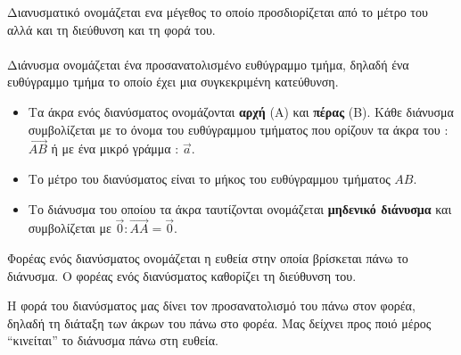 \documentclass[twoside,nofonts,internet,shmeiwseis]{thewria}
\begin{document}
\orismoi
{}
Διανυσματικό ονομάζεται ενα μέγεθος το οποίο προσδιορίζεται από το μέτρο του αλλά και τη διεύθυνση και τη φορά του.\\\\
Διάνυσμα ονομάζεται ένα προσανατολισμένο ευθύγραμμο τμήμα, δηλαδή ένα ευθύγραμμο τμήμα το οποίο έχει μια συγκεκριμένη κατεύθυνση.
\begin{itemize}
\item Τα άκρα ενός διανύσματος ονομάζονται \textbf{αρχή} (Α) και \textbf{πέρας} (Β). Κάθε διάνυσμα συμβολίζεται με το όνομα του ευθύγραμμου τμήματος που ορίζουν τα άκρα του : $  \overrightarrow{AB}$ ή με ένα μικρό γράμμα : $ \vec{a} $.
\item Το μέτρο του διανύσματος είναι το μήκος του ευθύγραμμου τμήματος $ ΑΒ $.
\item Το διάνυσμα του οποίου τα άκρα ταυτίζονται ονομάζεται \textbf{μηδενικό διάνυσμα} και συμβολίζεται με $ \vec{0} : \overrightarrow{AA}=\vec{0}$.
\end{itemize}
Φορέας ενός διανύσματος ονομάζεται η ευθεία στην οποία βρίσκεται πάνω το διάνυσμα. Ο φορέας ενός διανύσματος καθορίζει τη διεύθυνση του. 
\begin{center}
\end{center}
Η φορά του διανύσματος μας δίνει τον προσανατολισμό του πάνω στον φορέα, δηλαδή τη διάταξη των άκρων του πάνω στο φορέα. Μας δείχνει προς ποιό μέρος \textquotedblleft κινείται\textquotedblright\; το διάνυσμα πάνω στη ευθεία.\\\\
\end{document}
